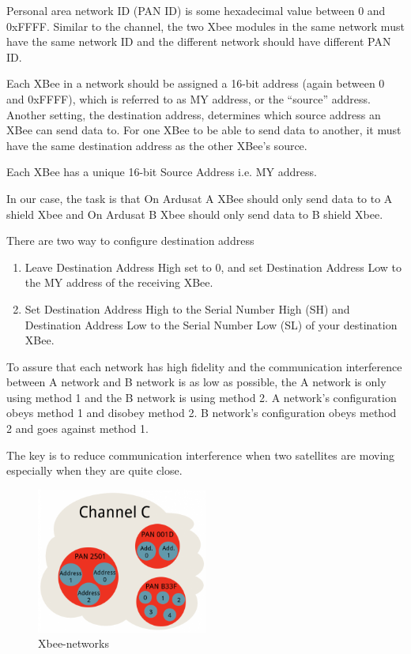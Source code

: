 Personal area network ID (PAN ID) is some hexadecimal value between 0 and 0xFFFF. Similar to the channel, the two Xbee modules in the same network must have the same network ID and the different network should have different PAN ID.

 Each XBee in a network should be assigned a 16-bit address (again between 0 and 0xFFFF), which is referred to as MY address, or the “source” address. Another setting, the destination address, determines which source address an XBee can send data to. For one XBee to be able to send data to another, it must have the same destination address as the other XBee's source.

Each XBee has a unique 16-bit Source Address i.e. MY address.

In our case, the task is that On Ardusat A XBee should only send data to to A shield Xbee and On Ardusat B Xbee should only send data to B shield Xbee.

There are two way to configure destination address
\begin{enumerate}
\item Leave Destination Address High set to 0, and set Destination Address Low to the MY address of the receiving XBee.

\item Set Destination Address High to the Serial Number High (SH) and Destination Address Low to the Serial Number Low (SL) of your destination XBee.
\end{enumerate}
To assure that each network has high fidelity and the communication interference between A network and B network is as low as possible, the A network is only using method 1 and the B network is using method 2. A network's configuration obeys method 1 and disobey method 2. B network's configuration obeys method 2 and goes against method 1.

The key is to reduce communication interference when two satellites are moving especially when they are quite close.

\begin{figure}[ht]
\centering
\includegraphics[width=0.5\textwidth]{fig/DOE/Network}
\caption{Xbee-networks}
\end{figure}

\newpage